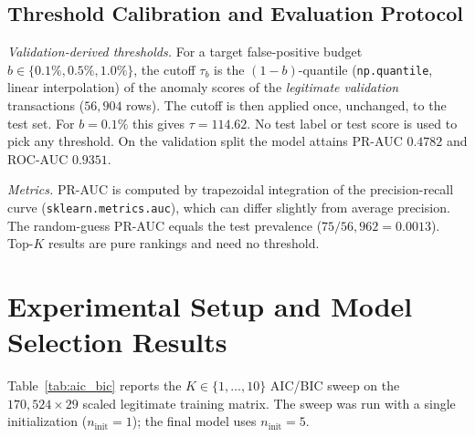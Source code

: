 \documentclass[conference]{IEEEtran}
\begin{document}
\subsection{Threshold Calibration and Evaluation Protocol}
\label{sec:protocol}
\textit{Validation-derived thresholds.} For a target false-positive budget $b \in \{0.1\%, 0.5\%, 1.0\%\}$, the cutoff $\tau_b$ is the $(1-b)$-quantile (\texttt{np.quantile}, linear interpolation) of the anomaly scores of the \emph{legitimate validation} transactions ($56{,}904$ rows). The cutoff is then applied once, unchanged, to the test set. For $b = 0.1\%$ this gives $\tau = 114.62$. No test label or test score is used to pick any threshold. On the validation split the model attains PR-AUC $0.4782$ and ROC-AUC $0.9351$.

\textit{Metrics.} PR-AUC is computed by trapezoidal integration of the precision-recall curve (\texttt{sklearn.metrics.auc}), which can differ slightly from average precision. The random-guess PR-AUC equals the test prevalence ($75/56{,}962 = 0.0013$). Top-$K$ results are pure rankings and need no threshold.

\section{Experimental Setup and Model Selection Results}
\label{sec:aicbic}

Table~\ref{tab:aic_bic} reports the $K \in \{1,\dots,10\}$ AIC/BIC sweep on the $170{,}524 \times 29$ scaled legitimate training matrix. The sweep was run with a single initialization ($n_{\text{init}} = 1$); the final model uses $n_{\text{init}} = 5$.
\end{document}
